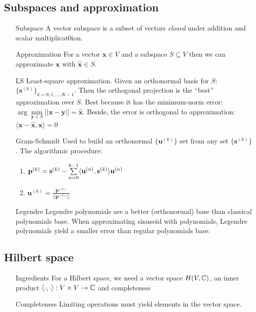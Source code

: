 \documentclass[11pt,a4paper]{article}
\begin{document}
\subsection{Subspaces and approximation}
\begin{itemize}
    \item[Subspace] A vector subspace is a subset of vectors \textit{closed} under addition and scalar multiplicat0ion. 
    \item[Approximation]For a vector $\mathbf{x} \in V$ and a subspace $S \subseteq V$ then we can approximate $\mathbf{x}$ with $\hat{\mathbf{x}} \in S$.
    \item[LS]Least-square approximation. Given an orthonormal basis for $S$: ${\{\mathbf{s}^{(k)}\}}_{k=0,1,\ldots,K-1}$. Then the orthogonal projection is the ``best'' approximation over $S$. Best because it has the minimum-norm error: $\arg\min\limits_{\mathbf{y} \in S} ||\mathbf{x}- \mathbf{y}|| = \hat{\mathbf{x}}$. Beside, the error is orthogonal to approximation: $\langle\mathbf{x}-\hat{\mathbf{x}},\mathbf{x}\rangle = 0$
    \item[Gram-Schmidt]Used to build an orthonormal $\{\mathbf{u}^{(k)}\}$ set from any set $\{\mathbf{s}^{(k)}\}$. The algorithmic procedure: 
        \begin{enumerate}
            \item $\mathbf{p}^{(k)} = \mathbf{s}^{(k)} - \somme{k-1}{n=0}\langle\mathbf{u}^{(n)},\mathbf{s}^{(k)}\rangle\mathbf{u}^{(n)}$
            \item $\mathbf{u}^{(k)} = \frac{\mathbf{p}^{(k)}}{||\mathbf{p}^{(k)}||}$
        \end{enumerate}
    \item[Legendre]Legendre polynomials are a better (orthonormal) base than classical polynomials base. When approximating sinusoid with polynomials, Legendre polynomials yield a smaller error than regular polynomials base.
\end{itemize}

\subsection{Hilbert space}
\begin{itemize}
    \item[Ingredients]For a Hilbert space, we need a vector space $H(V,\C)$, an inner product $\langle\cdot,\cdot\rangle : V \times V \to \C$ and completeness
    \item[Completeness]Limiting operations must yield elements in the vector space.
\end{itemize}
\end{document}
